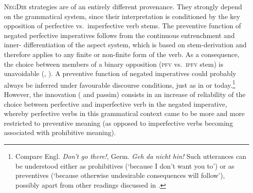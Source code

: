 \documentclass[output=paper,colorlinks,citecolor=brown]{langscibook}
\begin{document}
\textsc{NegDir} strategies are of an entirely different provenance. They strongly depend on the grammatical system, since their interpretation is conditioned by the key opposition of perfective vs.\ imperfective verb stems. The preventive function of negated perfective imperatives follows from the continuous entrenchment and inner- differentiation of the aspect system, which is based on stem-derivation and therefore applies to any finite or non-finite form of the verb. As a consequence, the choice between members of a binary opposition (\textsc{pfv} vs.\ \textsc{ipfv} stem) is unavoidable (\citealt{Wiemer2008}, \citealt{Seržant2017}). A preventive function of negated imperatives could probably always be inferred under favourable discourse conditions, just as in  or  today.\footnote{Compare Engl. \textit{Don't go there!}, Germ. \textit{Geh da nicht hin!} Such utterances can be understood either as prohibitives (`because I don't want you to') or as preventives (`because otherwise undesirable consequences will follow'), possibly apart from other readings discussed in .} However, the innovation (\citealt[29--30]{Ivić1958} and passim) consists in an increase of reliability of the choice between perfective and imperfective verb in the negated imperative, whereby perfective verbs in this grammatical context came to be more and more restricted to preventive meaning (as opposed to imperfective verbs becoming associated with prohibitive meaning).
\end{document}
